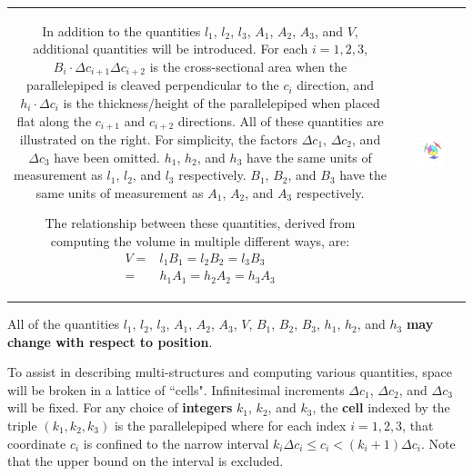 \begin{tabular}{cc}
\parbox{0.5\textwidth}{
In addition to the quantities \(l_1\), \(l_2\), \(l_3\), \(A_1\), \(A_2\), \(A_3\), and \(V\), additional quantities will be introduced. For each \(i = 1, 2, 3\), \(B_i \cdot \Delta c_{i+1} \Delta c_{i+2}\) is the cross-sectional area when the parallelepiped is cleaved perpendicular to the \(c_i\) direction, and \(h_i \cdot \Delta c_i\) is the thickness/height of the parallelepiped when placed flat along the \(c_{i+1}\) and \(c_{i+2}\) directions. All of these quantities are illustrated on the right. For simplicity, the factors \(\Delta c_1\), \(\Delta c_2\), and \(\Delta c_3\) have been omitted. \(h_1\), \(h_2\), and \(h_3\) have the same units of measurement as \(l_1\), \(l_2\), and \(l_3\) respectively. \(B_1\), \(B_2\), and \(B_3\) have the same units of measurement as \(A_1\), \(A_2\), and \(A_3\) respectively.  

The relationship between these quantities, derived from computing the volume in multiple different ways, are:
\begin{align*}
V = & l_1 B_1 = l_2 B_2 = l_3 B_3 \\ 
= & h_1 A_1 = h_2 A_2 = h_3 A_3
\end{align*} 
} & \parbox{0.5\textwidth}{
\includegraphics[width = 0.5\textwidth]{Coordinate_systems/coordinate_system}
}
\end{tabular}

All of the quantities \(l_1\), \(l_2\), \(l_3\), \(A_1\), \(A_2\), \(A_3\), \(V\), \(B_1\), \(B_2\), \(B_3\), \(h_1\), \(h_2\), and \(h_3\) {\bf may change with respect to position}.

To assist in describing multi-structures and computing various quantities, space will be broken in a lattice of ``cells". Infinitesimal increments \(\Delta c_1\), \(\Delta c_2\), and \(\Delta c_3\) will be fixed. For any choice of {\bf integers} \(k_1\), \(k_2\), and \(k_3\), the {\bf cell} indexed by the triple \((k_1, k_2, k_3)\) is the parallelepiped where for each index \(i = 1, 2, 3\), that coordinate \(c_i\) is confined to the narrow interval \(k_i \Delta c_i \leq c_i < (k_i + 1)\Delta c_i\). Note that the upper bound on the interval is excluded. 

